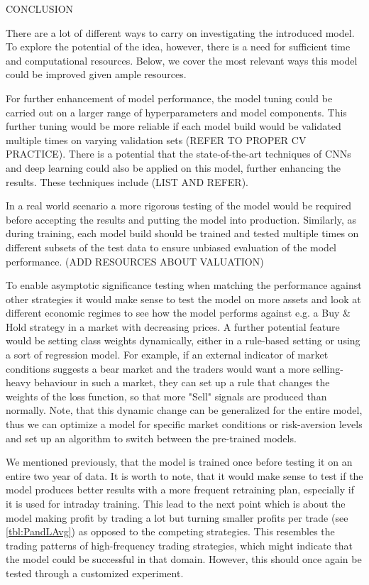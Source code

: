 \documentclass[11pt, a4paper]{article}
\begin{document}
CONCLUSION

There are a lot of different ways to carry on investigating the introduced model. To explore the potential of the idea, however, there is a need for sufficient time and computational resources. Below, we cover the most relevant ways this model could be improved given ample resources.

For further enhancement of model performance, the model tuning could be carried out on a larger range of hyperparameters and model components. This further tuning would be more reliable if each model build would be validated multiple times on varying validation sets (REFER TO PROPER CV PRACTICE). There is a potential that the state-of-the-art techniques of CNNs and deep learning could also be applied on this model, further enhancing the results. These techniques include (LIST AND REFER).

In a real world scenario a more rigorous testing of the model would be required before accepting the results and putting the model into production. Similarly, as during training, each model build should be trained and tested multiple times on different subsets of the test data to ensure unbiased evaluation of the model performance. (ADD RESOURCES ABOUT VALUATION)

To enable asymptotic significance testing when matching the performance against other strategies it would make sense to test the model on more assets and look at different economic regimes to see how the model performs against e.g. a Buy \& Hold strategy in a market with decreasing prices. A further potential feature would be setting class weights dynamically, either in a rule-based setting or using a sort of regression model. For example, if an external indicator of market conditions suggests a bear market and the traders would want a more selling-heavy behaviour in such a market, they can set up a rule that changes the weights of the loss function, so that more "Sell" signals are produced than normally. Note, that this dynamic change can be generalized for the entire model, thus we can optimize a model for specific market conditions or risk-aversion levels and set up an algorithm to switch between the pre-trained models.

We mentioned previously, that the model is trained once before testing it on an entire two year of data. It is worth to note, that it would make sense to test if the model produces better results with a more frequent retraining plan, especially if it is used for intraday training. This lead to the next point which is about the model making profit by trading a lot but turning smaller profits per trade (see \ref{tbl:PandLAvg}) as opposed to the competing strategies. This resembles the trading patterns of high-frequency trading strategies, which might indicate that the model could be successful in that domain. However, this should once again be tested through a customized experiment.
\end{document}
